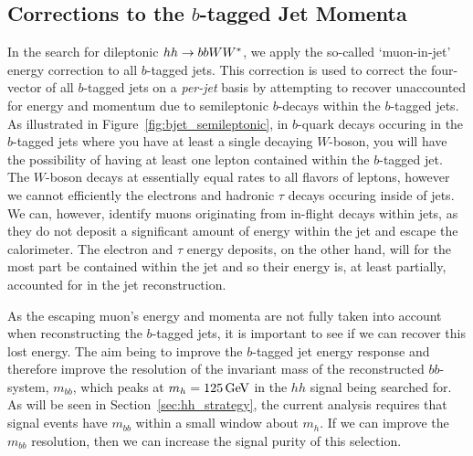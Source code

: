 %
%
\subsection{Corrections to the $b$-tagged Jet Momenta}
\label{sec:hh_bjet_correction}

In the search for dileptonic $hh \rightarrow bbWW^*$, we apply the so-called `muon-in-jet' energy
correction to all $b$-tagged jets.
This correction is used to correct the four-vector of all $b$-tagged jets on a \textit{per-jet} basis
by attempting to recover unaccounted for energy and momentum due to semileptonic $b$-decays within the
$b$-tagged jets.
As illustrated in Figure~\ref{fig:bjet_semileptonic}, in $b$-quark decays occuring in the $b$-tagged jets
where you have at least a single decaying $W$-boson, you will have the possibility of having at least one lepton
contained within the $b$-tagged jet.
The $W$-boson decays at essentially equal rates to all flavors of leptons, however we cannot efficiently
the electrons and hadronic $\tau$ decays occuring inside of jets.
We can, however, identify muons originating from in-flight decays within jets, as they do not deposit
a significant amount of energy within the jet and escape the calorimeter.
The electron and $\tau$ energy deposits, on the other hand, will for the most part be contained within
the jet and so their energy is, at least partially, accounted for in the jet reconstruction.

As the escaping muon's energy and momenta are not fully taken into account when reconstructing the $b$-tagged jets,
it is important to see if we can recover this lost energy.
The aim being to improve the $b$-tagged jet energy response and therefore improve the resolution of the invariant
mass of the reconstructed $bb$-system, $m_{bb}$, which peaks at $m_{h} = 125\,\text{Ge\kern -0.1em V}$ in the $hh$ signal
being searched for.
As will be seen in Section~\ref{sec:hh_strategy}, the current analysis requires that signal events
have $m_{bb}$ within a small window about $m_{h}$.
If we can improve the $m_{bb}$ resolution, then we can increase the signal purity of this selection.

